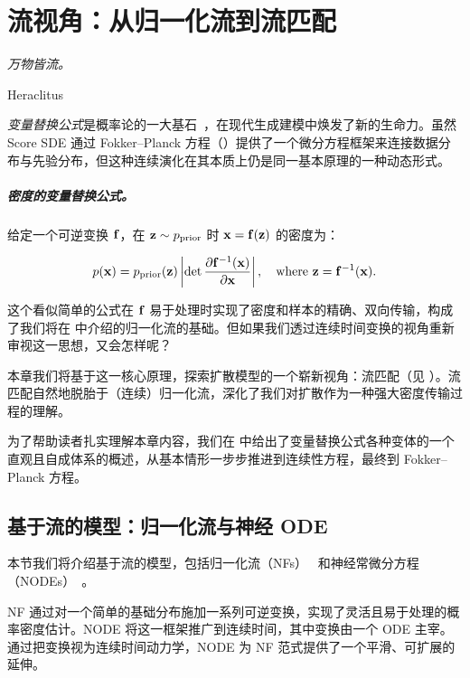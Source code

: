 \chapter{流视角：从归一化流到流匹配}\label{ch:flow-based}


\epigraph{
    \textit{万物皆流。
}}{Heraclitus}


\emph{变量替换公式}是概率论的一大基石~\citep{tabak2010density,tabak2013family}，在现代生成建模中焕发了新的生命力。虽然 Score SDE 通过 Fokker–Planck 方程（）提供了一个微分方程框架来连接数据分布与先验分布，但这种连续演化在其本质上仍是同一基本原理的一种动态形式。
\paragraph{密度的变量替换公式。}
给定一个可逆变换 ${\mathbf{f}}$，在 ${\mathbf{z}} \sim p_{\text{prior}}$ 时 ${\mathbf{x}} = {\mathbf{f}}({\mathbf{z}})$ 的密度为：
\begin{mdframed}
\begin{align}\label{eq:nf-change-of-var}
p({\mathbf{x}}) = p_{\text{prior}}({\mathbf{z}}) \left| \det \frac{\partial {\mathbf{f}}^{-1}({\mathbf{x}})}{\partial {\mathbf{x}}} \right|, \quad \text{where } {\mathbf{z}} = {\mathbf{f}}^{-1}({\mathbf{x}}).
\end{align}
\end{mdframed}
这个看似简单的公式在 ${\mathbf{f}}$ 易于处理时实现了密度和样本的精确、双向传输，构成了我们将在  中介绍的归一化流的基础。但如果我们透过连续时间变换的视角重新审视这一思想，又会怎样呢？

本章我们将基于这一核心原理，探索扩散模型的一个崭新视角：流匹配（见 ）。流匹配自然地脱胎于（连续）归一化流，深化了我们对扩散作为一种强大密度传输过程的理解。

为了帮助读者扎实理解本章内容，我们在  中给出了变量替换公式各种变体的一个直观且自成体系的概述，从基本情形一步步推进到连续性方程，最终到 Fokker–Planck 方程。

\newpage

\section{基于流的模型：归一化流与神经 ODE}\label{sec:flow-based-method}
本节我们将介绍基于流的模型，包括归一化流（NFs）~\citep{rezende2015variational} 和神经常微分方程（NODEs）~\citep{chen2018neural}。

NF 通过对一个简单的基础分布施加一系列可逆变换，实现了灵活且易于处理的概率密度估计。NODE 将这一框架推广到连续时间，其中变换由一个 ODE 主宰。通过把变换视为连续时间动力学，NODE 为 NF 范式提供了一个平滑、可扩展的延伸。




